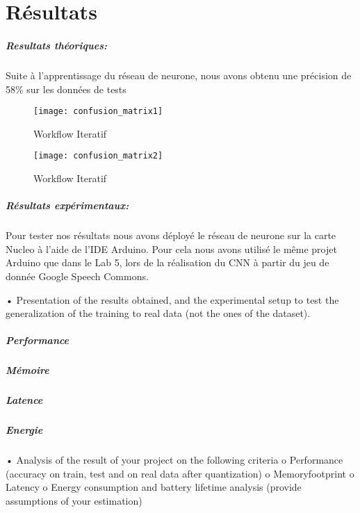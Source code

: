 \chapter{Résultats}


\paragraph{Resultats théoriques: }
Suite à l'apprentissage du réseau de neurone, nous avons obtenu une précision de 58\% sur les données de tests 

\begin{figure}[!ht]
  \texttt{[image: confusion\_matrix1]}
  \centering
  \caption{Workflow Iteratif}
  \label{graph:confusion_matrix1}
\end{figure}


\begin{figure}[!ht]
  \texttt{[image: confusion\_matrix2]}
  \centering
  \caption{Workflow Iteratif}
  \label{graph:confusion_matrix2}
\end{figure}


\paragraph{Résultats expérimentaux: } Pour tester nos résultats nous avons déployé le réseau de neurone sur la carte Nucleo à l'aide 
de l'IDE Arduino. Pour cela nous avons utilisé le même projet Arduino que dans le Lab 5, lors de la réalisation du CNN à partir du
jeu de donnée Google Speech Commons.



• Presentation of the results obtained, and the experimental setup to test the generalization of
the training to real data (not the ones of the dataset).


\paragraph{Performance}
\paragraph{Mémoire}
\paragraph{Latence}
\paragraph{Energie}
• Analysis of the result of your project on the following criteria
o Performance (accuracy on train, test and on real data after quantization)
o Memoryfootprint
o Latency
o Energy consumption and battery lifetime analysis (provide assumptions of your
estimation)

